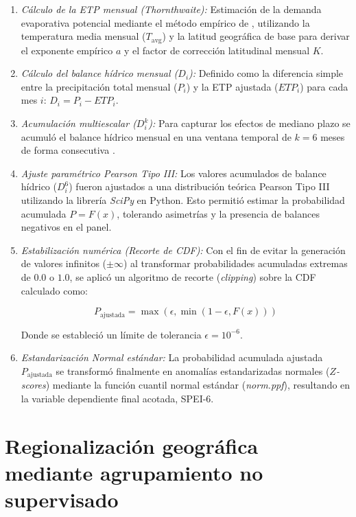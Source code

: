 \begin{enumerate}
    \item \textit{Cálculo de la ETP mensual (Thornthwaite):} Estimación de la demanda evaporativa potencial mediante el método empírico de , utilizando la temperatura media mensual ($T_{\text{avg}}$) y la latitud geográfica de base para derivar el exponente empírico $a$ y el factor de corrección latitudinal mensual $K$.
    \item \textit{Cálculo del balance hídrico mensual ($D_i$):} Definido como la diferencia simple entre la precipitación total mensual ($P_i$) y la ETP ajustada ($ETP_i$) para cada mes $i$: $D_i = P_i - ETP_i$.
    \item \textit{Acumulación multiescalar ($D^k_i$):} Para capturar los efectos de mediano plazo se acumuló el balance hídrico mensual en una ventana temporal de $k=6$ meses de forma consecutiva \cite{mckee1993}.
    \item \textit{Ajuste paramétrico Pearson Tipo III:} Los valores acumulados de balance hídrico ($D^6_i$) fueron ajustados a una distribución teórica Pearson Tipo III utilizando la librería \textit{SciPy} en Python. Esto permitió estimar la probabilidad acumulada $P = F(x)$, tolerando asimetrías y la presencia de balances negativos en el panel.
    \item \textit{Estabilización numérica (Recorte de CDF):} Con el fin de evitar la generación de valores infinitos ($\pm\infty$) al transformar probabilidades acumuladas extremas de $0.0$ o $1.0$, se aplicó un algoritmo de recorte (\textit{clipping}) sobre la CDF calculado como:
    
    \begin{equation}
        P_{\text{ajustada}} = \max\left(\epsilon, \min\left(1 - \epsilon, F(x)\right)\right)
    \end{equation}

    Donde se estableció un límite de tolerancia $\epsilon = 10^{-6}$.
    \item \textit{Estandarización Normal estándar:} La probabilidad acumulada ajustada $P_{\text{ajustada}}$ se transformó finalmente en anomalías estandarizadas normales (\textit{$Z$-scores}) mediante la función cuantil normal estándar (\textit{norm.ppf}), resultando en la variable dependiente final acotada, SPEI-6.
\end{enumerate}

\section{Regionalización geográfica mediante agrupamiento no supervisado}

